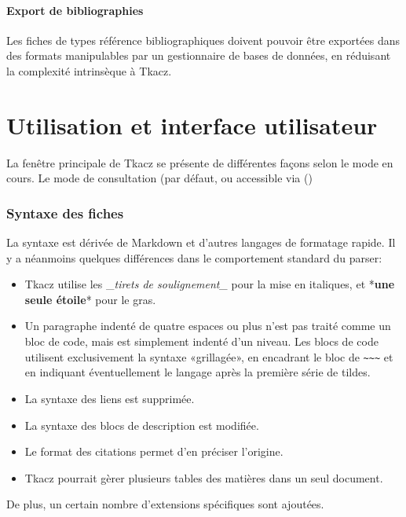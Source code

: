 \documentclass[11pt]{article}
\begin{document}
\subsection{Export de bibliographies}\label{export-de-bibliographies}

Les fiches de types \og référence bibliographiques \fg{} doivent pouvoir
être exportées dans des formats manipulables par un gestionnaire de
bases de données, en réduisant la complexité intrinsèque à Tkacz.

\part{Utilisation et interface utilisateur}

La fenêtre principale de Tkacz se présente de différentes façons selon
le mode en cours. Le mode de consultation (par défaut, ou accessible via
 ()

\section{Syntaxe des fiches}\label{syntaxe-des-fiches}

La syntaxe est dérivée de Markdown et d'autres langages de formatage
rapide. Il y a néanmoins quelques différences dans le comportement
standard du parser:

\begin{itemize}
\item
  Tkacz utilise les \_\emph{tirets de soulignement\_} pour la mise en
  italiques, et *\textbf{une seule étoile}* pour le gras.
\item
  Un paragraphe indenté de quatre espaces ou plus n'est pas traité comme
  un bloc de code, mais est simplement indenté d'un niveau. Les blocs de
  code utilisent exclusivement la syntaxe «grillagée», en encadrant le
  bloc de \texttt{\textasciitilde{}\textasciitilde{}\textasciitilde{}}
  et en indiquant éventuellement le langage après la première série de
  tildes.
\item
  La syntaxe des liens est supprimée.
\item
  La syntaxe des blocs de description est modifiée.
\item
  Le format des citations permet d'en préciser l'origine.
\item
  Tkacz pourrait gèrer plusieurs tables des matières dans un seul
  document.
\end{itemize}

De plus, un certain nombre d'extensions spécifiques sont ajoutées.
\end{document}

